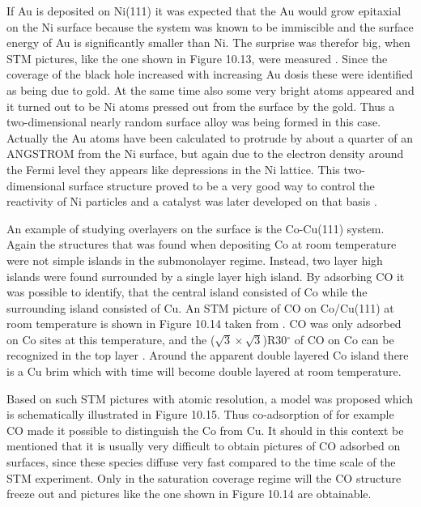 If Au is deposited on Ni(111) it was expected that the Au would grow epitaxial on the Ni surface because the system was known to be immiscible and the surface energy of Au is significantly smaller than Ni. The surprise was therefor big, when STM pictures, like the one shown in Figure 10.13, were measured \cite{Besenbacher3}. Since the coverage of the black hole increased with increasing Au dosis these were identified as being due to gold. At the same time also some very bright atoms appeared and it turned out to be Ni atoms pressed out from the surface by the gold. Thus a two-dimensional nearly random surface alloy was being formed in this case. Actually the Au atoms have been calculated to protrude by about  a quarter of an ANGSTROM from the Ni surface, but again due to the electron density around the Fermi level  they appears like depressions in the Ni lattice. This two-dimensional surface structure proved to be a very good way to control the  reactivity of Ni particles and a catalyst was later developed on that basis \cite{Science}.

\vspace*{11cm}


\vspace{1cm} 


An example of studying overlayers on the surface is the Co-Cu(111) system. Again the structures that was found when depositing Co at room temperature were not simple islands in the submonolayer regime. Instead,  two layer high islands were found surrounded by a single layer high island. By adsorbing CO it was possible to identify,  that the central island consisted of Co while the surrounding island consisted of Cu. An STM picture of CO on Co/Cu(111) at room temperature is shown in Figure 10.14 taken from \cite{Morten}. CO was only adsorbed on Co sites at this temperature, and the ($\sqrt{3}\times\sqrt{3}$)R30$^{\circ}$ of CO on Co can be recognized in the top layer \cite{Morten}. Around the apparent double layered Co island there is a Cu brim which with time will become double layered at room temperature. 

\vspace*{11cm}


\vspace{1cm} 



Based on such STM pictures with atomic resolution, a model was proposed which is schematically illustrated in Figure 10.15. Thus co-adsorption of for example CO made it possible to distinguish the Co from Cu. It should in this context be mentioned that it is usually very difficult to obtain pictures of CO adsorbed on surfaces, since these species diffuse very fast compared to the time scale of the STM experiment. Only in the saturation coverage regime will  the  CO structure  freeze out and pictures like the one shown in Figure 10.14 are  obtainable.


